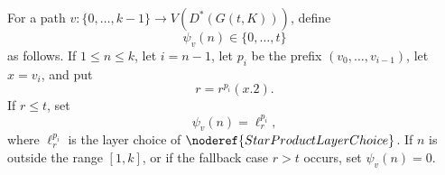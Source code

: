 \begin{definition}
For a path \(v:\{0,\ldots,k-1\}\to V(D^*(G(t,K)))\), define
\[
  \psi_v(n)\in\{0,\ldots,t\}
\]
as follows.  If \(1\le n\le k\), let \(i=n-1\), let \(p_i\) be the prefix
\((v_0,\ldots,v_{i-1})\), let \(x=v_i\), and put
\[
  r=r^{p_i}(x.2).
\]
If \(r\le t\), set
\[
  \psi_v(n)=\ell_r^{p_i},
\]
where \(\ell_r^{p_i}\) is the layer choice of
\(\noderef{StarProductLayerChoice}\).  If \(n\) is outside the range
\([1,k]\), or if the fallback case \(r>t\) occurs, set \(\psi_v(n)=0\).
\end{definition}
